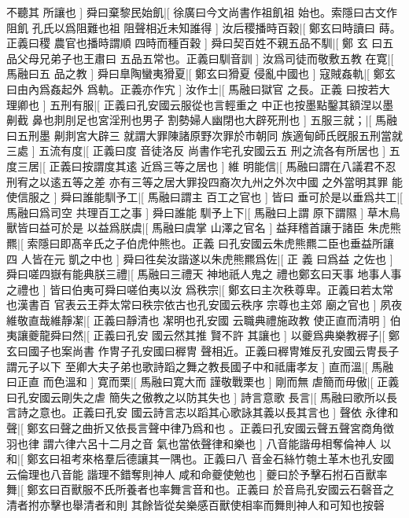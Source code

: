 不聽其%
所讓也%
]%
舜曰棄黎民始飢|[%
徐廣曰今文尚書作祖飢祖%
始也。索隱曰古文作阻飢%
%
孔氏以爲阻難也祖%
阻聲相近未知誰得%
]%
汝后稷播時百穀|[%
鄭玄曰時讀曰%
蒔。正義曰稷%
%
農官也播時謂順%
四時而種百穀%
]%
舜曰契百姓不親五品不馴|[%
鄭%
玄%
%
曰五品父母兄弟子也王肅曰%
五品五常也。正義曰馴音訓%
]%
汝爲司徒而敬敷五教%
在寛|[%
馬融曰五%
品之教%
]%
舜曰臯陶蠻夷猾夏|[%
鄭玄曰猾夏%
侵亂中國也%
]%
寇賊姦軌|[%
鄭玄曰由內爲姦起外%
爲軌。正義亦作宄%
]%
汝作士|[%
馬融曰獄官%
之長。正義%
%
曰按若大%
理卿也%
]%
五刑有服|[%
正義曰孔安國云服從也言輕重之%
中正也按墨點鑿其額涅以墨劓截%
%
鼻也剕刖足也宮淫刑也男子%
割勢婦人幽閉也大辟死刑也%
]%
五服三就；|[%
馬融曰五刑墨%
劓剕宮大辟三%
%
就謂大罪陳諸原野次罪於市朝同%
族適甸師氏旣服五刑當就三處%
]%
五流有度|[%
正義曰度%
音徒洛反%
%
尚書作宅孔安國云五%
刑之流各有所居也%
]%
五度三居|[%
正義曰按謂度其逺%
近爲三等之居也%
]%
維%
明能信|[%
馬融曰謂在八議君不忍刑宥之以逺五等之差%
亦有三等之居大罪投四裔次九州之外次中國%
%
之外當明其罪%
能使信服之%
]%
舜曰誰能馴予工|[%
馬融曰謂主%
百工之官也%
]%
皆曰%
垂可於是以垂爲共工|[%
馬融曰爲司空%
共理百工之事%
]%
舜曰誰能%
馴予上下|[%
馬融曰上謂%
原下謂隰%
]%
草木鳥獸皆曰益可於是%
以益爲朕虞|[%
馬融曰虞掌%
山澤之官名%
]%
益拜稽首讓于諸臣%
朱虎熊羆|[%
索隱曰即髙辛氏之子伯虎仲熊也。正義%
曰孔安國云朱虎熊羆二臣也垂益所讓四%
%
人皆在元%
凱之中也%
]%
舜曰徃矣汝諧遂以朱虎熊羆爲佐|[%
正%
義%
%
曰爲益%
之佐也%
]%
舜曰嗟四嶽有能典朕三禮|[%
馬融曰三禮天%
神地祇人鬼之%
%
禮也鄭玄曰天事%
地事人事之禮也%
]%
皆曰伯夷可舜曰嗟伯夷以汝%
爲秩宗|[%
鄭玄曰主次秩尊卑。正義曰若太常也漢書百%
官表云王莽太常曰秩宗依古也孔安國云秩序%
%
宗尊也主郊%
廟之官也%
]%
夙夜維敬直哉維靜㓗|[%
正義曰靜清也%
㓗明也孔安國%
%
云職典禮施政教%
使正直而清明%
]%
伯夷讓夔龍舜曰然|[%
正義曰孔安%
國云然其推%
%
賢不許%
其讓也%
]%
以夔爲典樂教稺子|[%
鄭玄曰國子也案尚書%
作冑子孔安國曰稺冑%
%
聲相近。正義曰稺冑雉反孔安國云冑長子謂元子以下%
至卿大夫子弟也歌詩蹈之舞之教長國子中和祗庸孝友%
]%
直而溫|[%
馬融曰正直%
而色溫和%
]%
寛而栗|[%
馬融曰寛大而%
謹敬戰栗也%
]%
剛而無%
虐簡而毋傲|[%
正義曰孔安國云剛失之虐%
簡失之傲教之以防其失也%
]%
詩言意歌%
長言|[%
馬融曰歌所以長言詩之意也。正義曰孔安%
國云詩言志以蹈其心歌詠其義以長其言也%
]%
聲依%
永律和聲|[%
鄭玄曰聲之曲折又依長言聲中律乃爲和也%
。正義曰孔安國云聲五聲宮商角徴羽也律%
%
謂六律六呂十二月之音%
氣也當依聲律和樂也%
]%
八音能諧毋相奪倫神人%
以和|[%
鄭玄曰祖考來格羣后德讓其一隅也。正義曰八%
音金石絲竹匏土革木也孔安國云倫理也八音能%
%
諧理不錯奪則神人%
咸和命夔使勉也%
]%
夔曰於予擊石拊石百獸率%
舞|[%
鄭玄曰百獸服不氏所養者也率舞言音和也。正義曰%
於音烏孔安國云石磬音之清者拊亦擊也舉清者和則%
%
其餘皆從矣樂感百獸使相率而舞則神人和可知也按磬%
